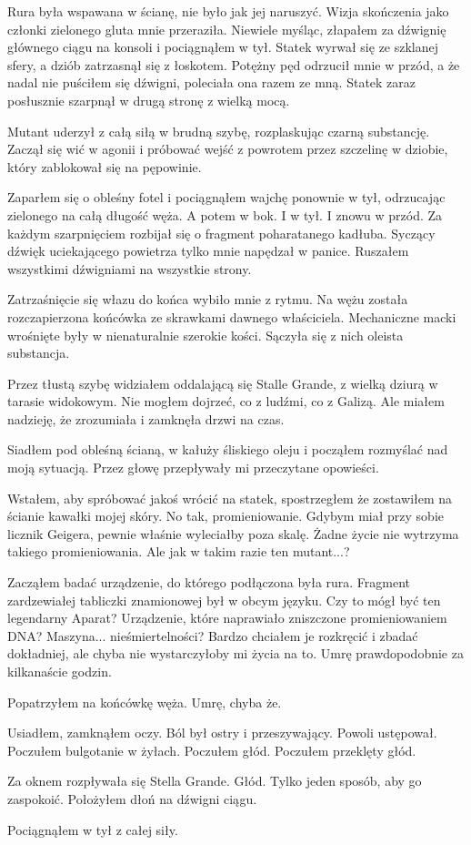 Rura była wspawana w ścianę, nie było jak jej naruszyć. Wizja skończenia jako członki zielonego gluta mnie przeraziła.
Niewiele myśląc, złapałem za dźwignię głównego ciągu na konsoli i pociągnąłem w tył.
Statek wyrwał się ze szklanej sfery, a dziób zatrzasnął się z łoskotem.
Potężny pęd odrzucił mnie w przód, a że nadal nie puściłem się dźwigni, poleciała ona razem ze mną.
Statek zaraz posłusznie szarpnął w drugą stronę z wielką mocą.

Mutant uderzył z całą siłą w brudną szybę, rozplaskując czarną substancję. Zaczął się wić w agonii i próbować wejść z powrotem przez szczelinę w dziobie, który zablokował się na pępowinie.

Zaparłem się o obleśny fotel i pociągnąłem wajchę ponownie w tył, odrzucając zielonego na całą długość węża.
A potem w bok. I w tył. I znowu w przód.
Za każdym szarpnięciem rozbijał się o fragment poharatanego kadłuba.
Syczący dźwięk uciekającego powietrza tylko mnie napędzał w panice.
Ruszałem wszystkimi dźwigniami na wszystkie strony.

Zatrzaśnięcie się włazu do końca wybiło mnie z rytmu.
Na wężu została rozczapierzona końcówka ze skrawkami dawnego właściciela.
Mechaniczne macki wrośnięte były w nienaturalnie szerokie kości.
Sączyła się z nich oleista substancja.

Przez tłustą szybę widziałem oddalającą się Stalle Grande, z wielką dziurą w tarasie widokowym.
Nie mogłem dojrzeć, co z ludźmi, co z Galizą.
Ale miałem nadzieję, że zrozumiała i zamknęła drzwi na czas.

Siadłem pod obleśną ścianą, w kałuży śliskiego oleju i począłem rozmyślać nad moją sytuacją.
Przez głowę przepływały mi przeczytane opowieści.

Wstałem, aby spróbować jakoś wrócić na statek, spostrzegłem że zostawiłem na ścianie kawałki mojej skóry.
No tak, promieniowanie. Gdybym miał przy sobie licznik Geigera, pewnie właśnie wyleciałby poza skalę.
Żadne życie nie wytrzyma takiego promieniowania.
Ale jak w takim razie ten mutant...?

Zacząłem badać urządzenie, do którego podłączona była rura.
Fragment zardzewiałej tabliczki znamionowej był w obcym języku.
Czy to mógł być ten legendarny Aparat?
Urządzenie, które naprawiało zniszczone promieniowaniem DNA? Maszyna... nieśmiertelności?
Bardzo chciałem je rozkręcić i zbadać dokładniej, ale chyba nie wystarczyłoby mi życia na to.
Umrę prawdopodobnie za kilkanaście godzin.

Popatrzyłem na końcówkę węża.
Umrę, chyba że.

Usiadłem, zamknąłem oczy.
Ból był ostry i przeszywający.
Powoli ustępował.
Poczułem bulgotanie w żyłach.
Poczułem głód.
Poczułem przeklęty głód.

Za oknem rozpływała się Stella Grande. Głód. Tylko jeden sposób, aby go zaspokoić.
Położyłem dłoń na dźwigni ciągu.

Pociągnąłem w tył z całej siły.



